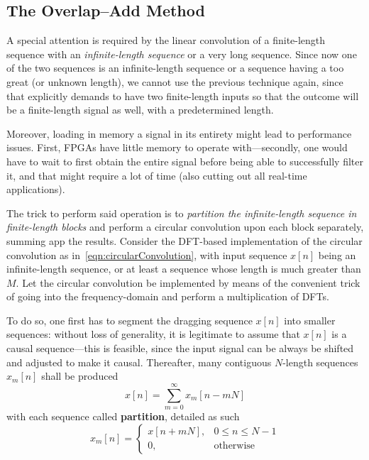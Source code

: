 \documentclass[\documentfontsize, twocolumn]{\classname}
\begin{document}
\subsection{The Overlap--Add Method}

A special attention is required by the linear convolution of a finite-length sequence with an \emph{infinite-length sequence} or a very long sequence. Since now one of the two sequences is an infinite-length sequence or a sequence having a too great (or unknown length), we cannot use the previous technique again, since that explicitly demands to have two finite-length inputs so that the outcome will be a finite-length signal as well, with a predetermined length.

Moreover, loading in memory a signal in its entirety might lead to performance issues. First, FPGAs have little memory to operate with---secondly, one would have to wait to first obtain the entire signal before being able to successfully filter it, and that might require a lot of time (also cutting out all real-time applications).

The trick to perform said operation is to \emph{partition the infinite-length sequence in finite-length blocks} and perform a circular convolution upon each block separately, summing app the results. Consider the DFT-based implementation of the circular convolution as in~\ref{eqn:circularConvolution}, with input sequence $x[n]$ being an infinite-length sequence, or at least a sequence whose length is much greater than $M$. Let the circular convolution be implemented by means of the convenient trick of going into the frequency-domain and perform a multiplication of DFTs.

To do so, one first has to segment the dragging sequence $x[n]$ into smaller sequences: without loss of generality, it is legitimate to assume that $x[n]$ is a causal sequence---this is feasible, since the input signal can be always be shifted and adjusted to make it causal. Thereafter, many contiguous $N$-length sequences $x_m[n]$ shall be produced
\[
    x[n] = \sum_{m=0}^{\infty} x_m[n - mN]
\]
with each sequence called \textbf{partition}, detailed as such
\[
    x_m[n] =
    \left\{
        \begin{array}{ll}
            x[n + mN], & 0 \leq n \leq N-1\\
            0, & \mbox{otherwise}
        \end{array}
    \right.
\]
\end{document}
